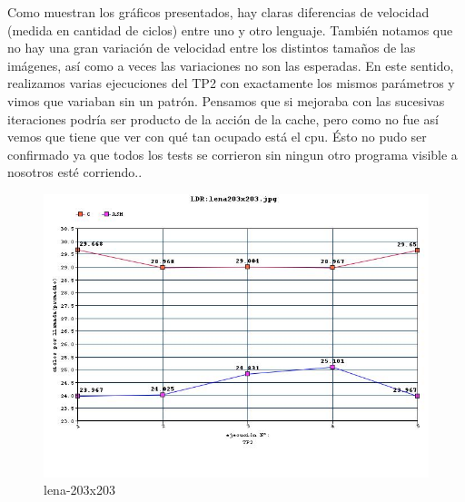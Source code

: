 Como muestran los gr\'aficos presentados, hay claras diferencias de velocidad (medida en cantidad de ciclos) entre uno y otro lenguaje. Tambi\'en notamos que no hay una gran 
variaci\'on de velocidad entre los distintos tamaños de las im\'agenes, as\'i como a veces las variaciones no son las esperadas. En este sentido, realizamos varias ejecuciones 
del TP2 con exactamente los mismos par\'ametros y vimos que variaban sin un patr\'on. Pensamos que si mejoraba con las sucesivas iteraciones podr\'ia ser 
producto de la acci\'on de la cache, pero como no fue as\'i vemos que tiene que ver con qu\'e tan ocupado est\'a el cpu. \'Esto no pudo ser confirmado ya que todos 
los tests se corrieron sin ningun otro programa visible a nosotros est\'e corriendo..
\begin{figure}
  \begin{center}
	\includegraphics[scale=0.66]{imagenes/ldr-lena-203.jpg}
	\caption{lena-203x203}
	\label{lena-203x203}
  \end{center}
\end{figure}

